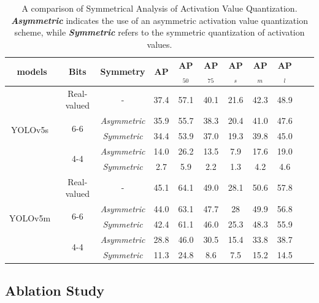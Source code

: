 \documentclass[runningheads]{llncs}
\begin{document}
\begin{table}[!t]
\centering
\caption{A comparison of Symmetrical Analysis of Activation Value Quantization. \textbf{\textit{Asymmetric}} indicates the use of an asymmetric activation value quantization scheme, while \textbf{\textit{Symmetric}} refers to the symmetric quantization of activation values.}
\footnotesize
\begin{tabular}{ccccccccccc}
\hline
models                   & Bits                 & Symmetry   & AP   & AP$_{50}$  & AP$_{75}$  & AP$_{s}$  & AP$_{m}$  & AP$_{l}$  \\ \hline
\multirow{5}{*}{YOLOv5s~\cite{yolov5}} & Real-valued          &    -       & 37.4 & 57.1 & 40.1 & 21.6 & 42.3 & 48.9 \\ \cline{2-9} 
                         & \multirow{2}{*}{6-6} & \textit{Asymmetric} & 35.9 & 55.7 & 38.3 & 20.4 & 41.0 & 47.6 \\
                         &                      & \textit{Symmetric}  & 34.4 & 53.9 & 37.0 & 19.3 & 39.8 & 45.0 \\ \cline{2-9} 
                         & \multirow{2}{*}{4-4} & \textit{Asymmetric} & 14.0 & 26.2 & 13.5 & 7.9  & 17.6 & 19.0 \\
                         &                      & \textit{Symmetric}  & 2.7  & 5.9  & 2.2  & 1.3  & 4.2  & 4.6  \\ \hline
\multirow{5}{*}{YOLOv5m~\cite{yolov5}} & Real-valued          &    -       & 45.1 & 64.1 & 49.0 & 28.1 & 50.6 & 57.8 \\ \cline{2-9} 
                         & \multirow{2}{*}{6-6} & \textit{Asymmetric} & 44.0 & 63.1 & 47.7 & 28   & 49.9 & 56.8 \\
                         &                      & \textit{Symmetric}  & 42.4 & 61.1 & 46.0 & 25.3 & 48.3 & 55.9 \\ \cline{2-9} 
                         & \multirow{2}{*}{4-4} & \textit{Asymmetric} & 28.8 & 46.0 & 30.5 & 15.4 & 33.8 & 38.7 \\
                         &                      & \textit{Symmetric}  & 11.3 & 24.8 & 8.6  & 7.5  & 15.2 & 14.5 \\ \hline
\end{tabular}
\label{exp_sys}
\end{table}

\subsection{Ablation Study}
\end{document}
